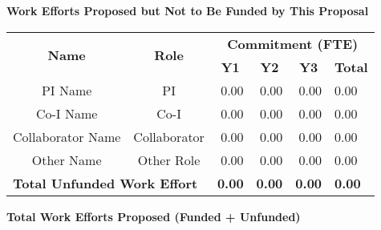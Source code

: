 \documentclass[oneside,12pt]{article}
\begin{document}
    \vspace{1em}

    \begin{center}
        \textbf{Work Efforts Proposed but Not to Be Funded by This Proposal}
        \vspace{-1em}
    \end{center}

    \begin{table}[h]
        \centering
        \begin{tabular}{|c|c|r|r|r|l|}
            \hline
            \multirow{2}{*}{\textbf{Name}} & \multirow{2}{*}{\textbf{Role}} & \multicolumn{4}{c|}{\textbf{Commitment (FTE)}} \\
            \cline{3-6}
            & & \multicolumn{1}{c|}{\textbf{Y1}} & \multicolumn{1}{c|}{\textbf{Y2}} & \multicolumn{1}{c|}{\textbf{Y3}} & \multicolumn{1}{c|}{\textbf{Total}} \\
            \hline
            PI Name           & PI           & 0.00 & 0.00 & 0.00 & 0.00 \\
            Co-I Name         & Co-I         & 0.00 & 0.00 & 0.00 & 0.00 \\
            Collaborator Name & Collaborator & 0.00 & 0.00 & 0.00 & 0.00 \\
            Other Name        & Other Role   & 0.00 & 0.00 & 0.00 & 0.00 \\
            \hline
            \multicolumn{2}{|l|}{\textbf{Total Unfunded Work Effort}} & \textbf{0.00} & \textbf{0.00} & \textbf{0.00} & \textbf{0.00} \\
            \hline
        \end{tabular}
    \end{table}

    \vspace{1em}

    \begin{center}
        \textbf{Total Work Efforts Proposed (Funded + Unfunded)}
        \vspace{-1em}
    \end{center}
\end{document}
